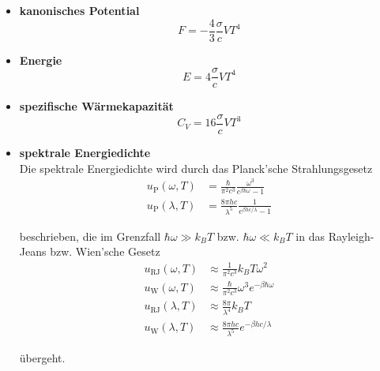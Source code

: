 \documentclass{article}
\begin{document}
	\begin{itemize}
		\item \textbf{kanonisches Potential}
			\begin{equation}
				F = - \frac{4}{3}\frac{\sigma}{c}V T^4
			\end{equation}
		
		\item \textbf{Energie}
			\begin{equation}
				E = 4 \frac{\sigma}{c} V T^4
			\end{equation}
		
		
		\item \textbf{spezifische Wärmekapazität}
			\begin{equation}
				C_V = 16 \frac{\sigma}{c} V T^3
			\end{equation}
		
		
		\item \textbf{spektrale Energiedichte}\\
		Die spektrale Energiedichte wird durch das Planck'sche Strahlungsgesetz
			\begin{align}
				u_{\text{P}}(\omega,T) &= \frac{\hbar}{\pi^2 c^3} \frac{\omega^3}{e^{\beta \hbar\omega} - 1} \\
				u_{\text{P}}(\lambda,T) &= \frac{8\pi h c}{\lambda^5} \frac{1}{e^{\beta h c / \lambda} - 1}
			\end{align}

		beschrieben, die im Grenzfall $\hbar\omega\gg k_B T$ bzw. $\hbar\omega\ll k_B T$ in das Rayleigh-Jeans bzw. Wien'sche Gesetz
			\begin{align}
				u_{\text{RJ}}(\omega, T) &\approx \frac{1}{\pi^2 c^3} k_B T \omega^2 \\
				u_{\text{W}}(\omega,T) &\approx \frac{\hbar}{\pi^2 c^3} \omega^3 e^{-\beta \hbar \omega} \\
				u_{\text{RJ}}(\lambda, T) &\approx \frac{8\pi}{\lambda^4} k_B T \\
				u_{\text{W}}(\lambda,T) &\approx \frac{8\pi h c}{\lambda^5} e^{-\beta h c/\lambda}
			\end{align}

		übergeht.
	\end{itemize}


\newpage
\end{document}
